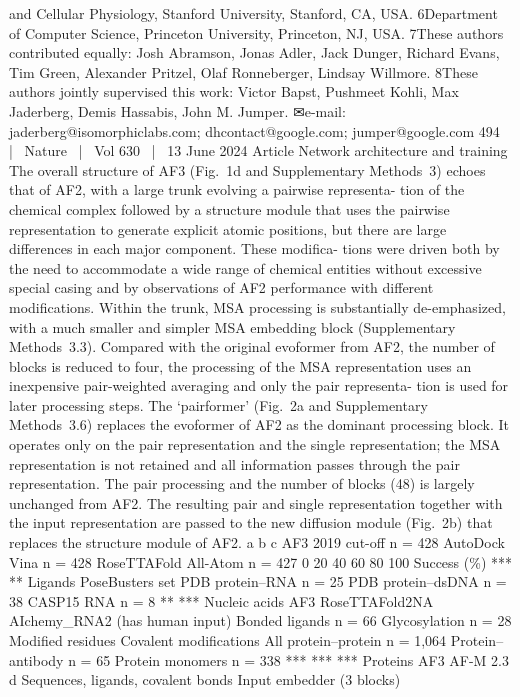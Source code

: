 and Cellular Physiology, Stanford University, Stanford, CA, USA. 6Department of Computer Science, Princeton University, Princeton, NJ, USA. 7These authors contributed equally: Josh Abramson,
Jonas Adler, Jack Dunger, Richard Evans, Tim Green, Alexander Pritzel, Olaf Ronneberger, Lindsay Willmore. 8These authors jointly supervised this work: Victor Bapst, Pushmeet Kohli,
Max Jaderberg, Demis Hassabis, John M. Jumper. ✉e-mail: jaderberg@isomorphiclabs.com; dhcontact@google.com; jumper@google.com
494  |  Nature  |  Vol 630  |  13 June 2024
Article
Network architecture and training
The overall structure of AF3 (Fig. 1d and Supplementary Methods 3)
echoes that of AF2, with a large trunk evolving a pairwise representa-
tion of the chemical complex followed by a structure module that uses
the pairwise representation to generate explicit atomic positions, but
there are large differences in each major component. These modifica-
tions were driven both by the need to accommodate a wide range of
chemical entities without excessive special casing and by observations
of AF2 performance with different modifications. Within the trunk,
MSA processing is substantially de-emphasized, with a much smaller
and simpler MSA embedding block (Supplementary Methods 3.3).
Compared with the original evoformer from AF2, the number of blocks
is reduced to four, the processing of the MSA representation uses an
inexpensive pair-weighted averaging and only the pair representa-
tion is used for later processing steps. The ‘pairformer’ (Fig. 2a and
Supplementary Methods 3.6) replaces the evoformer of AF2 as the
dominant processing block. It operates only on the pair representation
and the single representation; the MSA representation is not retained
and all information passes through the pair representation. The pair
processing and the number of blocks (48) is largely unchanged from
AF2. The resulting pair and single representation together with the
input representation are passed to the new diffusion module (Fig. 2b)
that replaces the structure module of AF2.
a
b
c
AF3
2019 cut-off
n = 428
AutoDock
Vina
n = 428
RoseTTAFold
All-Atom
n = 427
0
20
40
60
80
100
Success (\%)
***
**
Ligands PoseBusters set
PDB
protein–RNA
n = 25
PDB
protein–dsDNA
n = 38
CASP15
RNA
n = 8
**
***
Nucleic acids
AF3
RoseTTAFold2NA
AIchemy\_RNA2 (has human input)
Bonded
ligands
n = 66
Glycosylation
n = 28
Modiﬁed residues
Covalent modiﬁcations
All
protein–protein
n = 1,064
Protein–
antibody
n = 65
Protein
monomers
n = 338
***
***
***
Proteins
AF3
AF-M 2.3
d
Sequences,
ligands,
covalent
bonds
Input
embedder
(3 blocks)
